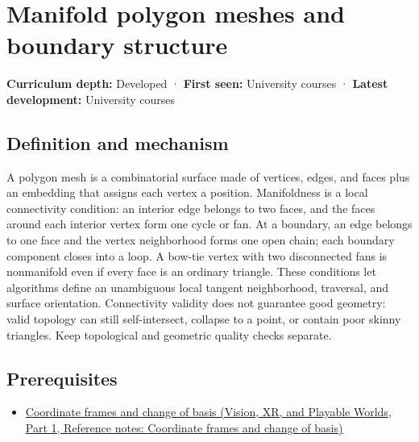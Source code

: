 \hypertarget{appendix-fab348609369}{}\label{referencestart:appendix-fab348609369}
\section{Manifold polygon meshes and boundary structure}\label{appendix-fab348609369-manifold-polygon-meshes-and-boundary-structure}

\hypertarget{appendix-fab348609369-manifold-polygon-meshes-and-boundary-structure}{}

\textbf{Curriculum depth:} Developed · \textbf{First seen:} University courses · \textbf{Latest development:} University courses

\begin{allmightroledefinition}

\subsection{Definition and mechanism}\label{appendix-fab348609369-definition-and-mechanism}

\hypertarget{appendix-fab348609369-definition-and-mechanism}{}

A polygon mesh is a combinatorial surface made of vertices, edges, and faces plus an embedding that assigns each vertex a position. Manifoldness is a local connectivity condition: an interior edge belongs to two faces, and the faces around each interior vertex form one cycle or fan. At a boundary, an edge belongs to one face and the vertex neighborhood forms one open chain; each boundary component closes into a loop. A bow-tie vertex with two disconnected fans is nonmanifold even if every face is an ordinary triangle. These conditions let algorithms define an unambiguous local tangent neighborhood, traversal, and surface orientation. Connectivity validity does not guarantee good geometry: valid topology can still self-intersect, collapse to a point, or contain poor skinny triangles. Keep topological and geometric quality checks separate.

\end{allmightroledefinition}

\subsection{Prerequisites}\label{appendix-fab348609369-prerequisites}

\hypertarget{appendix-fab348609369-prerequisites}{}

\begin{itemize}
\tightlist
\item
  \href{../07-Vision-XR-and-Playable-Worlds-P01/main.pdf\#nameddest=appendix-1bae9457dbc3}{Coordinate frames and change of basis (Vision, XR, and Playable Worlds, Part 1, Reference notes: Coordinate frames and change of basis)}
\end{itemize}

